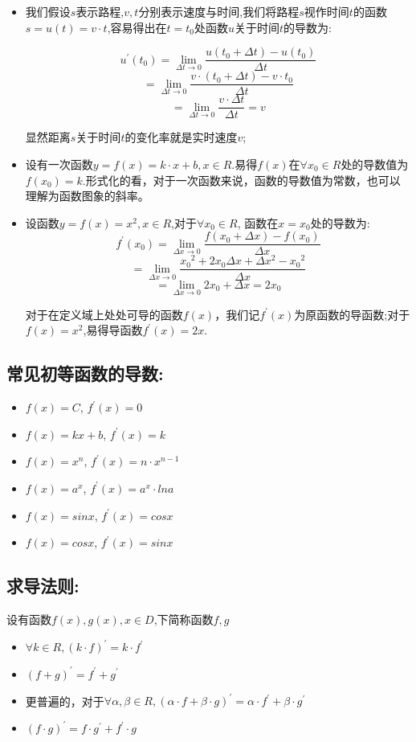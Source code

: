 \documentclass[UTF8]{article}
\begin{document}
\begin{itemize}
	\item 我们假设$s$表示路程,$v, t$分别表示速度与时间,我们将路程$s$视作时间$t$的函数$s = u(t) = v\cdot t$,容易得出在$t = t_0$处函数$u$关于时间$t$的导数为:

	$$u^{'}(t_0) = \lim_{\Delta t \to 0}\frac{u(t_0 + \Delta t) - u(t_0)}{\Delta t}$$ 
	$$= \lim_{\Delta t \to 0}\frac{v\cdot (t_0 + \Delta t) - v\cdot t_0}{\Delta t}$$
	$$= \lim_{\Delta t \to 0}\frac{v \cdot \Delta t}{\Delta t} = v$$

	显然距离$s$关于时间$t$的变化率就是实时速度$v$;\\

	\item 设有一次函数$y = f(x) = k\cdot x + b, x\in R$.易得$f(x)$在$\forall x_0\in R$处的导数值为$f(x_0) = k$.形式化的看，对于一次函数来说，函数的导数值为常数，也可以理解为函数图象的斜率。

	\item 设函数$y = f(x) = x^2, x\in R$,对于$\forall x_0 \in R$, 函数在$x = x_0$处的导数为:
	$$f^{'}(x_0) = \lim_{\Delta x \to 0} \frac{f(x_0 + \Delta x) - f(x_0)}{\Delta x}$$
	$$= \lim_{\Delta x \to 0} \frac{{x_0}^2 + 2x_0 \Delta x + \Delta x^2 - {x_0}^2}{\Delta x}$$
	$$= \lim_{\Delta x \to 0} 2x_0 + \Delta x = 2x_0$$

	对于在定义域上处处可导的函数$f(x)$，我们记$f^{'}(x)$为原函数的导函数;对于$f(x) = x^2$,易得导函数$f^{'}(x) = 2x$.
\end{itemize}

\subsection{常见初等函数的导数:}

\begin{itemize}
	\item $f(x) = C$, $f^{'}(x) = 0$
	\item $f(x) = kx + b$, $f^{'}(x) = k$
	\item $f(x) = x^n$, $f^{'}(x) = n\cdot x^{n-1}$
	\item $f(x) = a^x$, $f^{'}(x) = a^x\cdot ln a$
	\item $f(x) = sinx$, $f^{'}(x) = cosx$
	\item $f(x) = cosx$, $f^{'}(x) = sinx$
\end{itemize}

\subsection{求导法则:}
设有函数$f(x), g(x), x\in D$,下简称函数$f, g$
\begin{itemize}
	\item $\forall k \in R, (k\cdot f)^{'} = k \cdot f^{'}$
	\item $(f + g)^{'} = f^{'} + g^{'}$
	\item 更普遍的，对于$\forall \alpha, \beta \in R, (\alpha\cdot f + \beta\cdot g)^{'} = \alpha\cdot f^{'} + \beta\cdot g^{'}$
	\item $(f\cdot g)^{'} = f\cdot g^{'} + f^{'}\cdot g$
\end{itemize}
\end{document}
